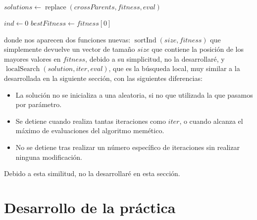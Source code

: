 \documentclass[11pt,a4paper]{article}
\begin{document}
\begin{scriptsize}
\begin{algorithm}[H]
{{			
		}		
		
		$solutions \gets \operatorname{replace}(crossParents, fitness, eval)$ \;
		}
	
	$ind \gets 0$ \;
	$bestFitness \gets fitness[0]$ \;
	
	 \;
\end{algorithm}
\end{scriptsize}

donde nos aparecen dos funciones nuevas: $\operatorname{sortInd}(size, fitness)$ que simplemente devuelve un vector de tamaño $size$ que contiene la posición de los mayores valores en $fitness$, debido a su simplicitud, no la desarrollaré, y $\operatorname{localSearch}(solution, iter, eval)$, que es la búsqueda local, muy similar a la desarrollada en la siguiente sección, con las siguientes diferencias:
\begin{itemize}
\item La solución no se inicializa a una aleatoria, si no que utilizada la que pasamos por parámetro.
\item Se detiene cuando realiza tantas iteraciones como $iter$, o cuando alcanza el máximo de evaluaciones del algoritmo memético.
\item No se detiene tras realizar un número específico de iteraciones sin realizar ninguna modificación.
\end{itemize}
Debido a esta similitud, no la desarrollaré en esta sección.

\newpage
\section{Desarrollo de la práctica}
\end{document}
